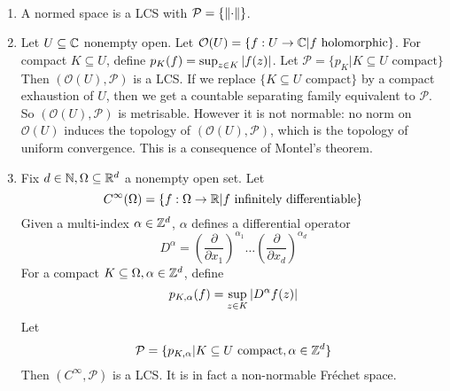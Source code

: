 \documentclass{article}
\begin{document}
\begin{egs}~

  \begin{enumerate}
    \item A normed space is a LCS with $\mathcal P = \{\left\lVert \cdot\right\rVert\}$.
    \item Let $U \subseteq \mathbb C$ nonempty open. Let $\mathcal O(U) = \{f : U \rightarrow \mathbb C | f \text{ holomorphic}\}$. For compact $K \subseteq U$, define $p_K(f) = \sup_{z \in K} \left\lvert f(z)\right\rvert$. Let
    $\mathcal P = \{p_K | K \subseteq U \text{ compact}\}$
    Then $(\mathcal O(U), \mathcal P)$ is a LCS. If we replace $\{K \subseteq U \text{ compact}\}$ by a compact exhaustion of $U$, then we get a countable separating family equivalent to $\mathcal P$. So $(\mathcal O(U), \mathcal P)$ is metrisable. However it is not normable: no norm on $\mathcal O(U)$ induces the topology of $(\mathcal O(U), \mathcal P)$, which is the topology of uniform convergence. This is a consequence of Montel's theorem.
    \item Fix $d \in \mathbb N, \Omega \subseteq \mathbb R^d$ a nonempty open set. Let
    $$C^\infty(\Omega) = \{f : \Omega \rightarrow \mathbb R | f \text{ infinitely differentiable}\}$$
    Given a multi-index $\alpha \in \mathbb Z^d$, $\alpha$ defines a differential operator
    $$D^\alpha = \left(\frac\partial{\partial x_1}\right)^{\alpha_1} \dots
    \left(\frac\partial{\partial x_d}\right)^{\alpha_d}$$
    For a compact $K \subseteq \Omega, \alpha \in \mathbb Z^d$, define
    $$p_{K, \alpha}(f) = \sup_{z \in K}\left\lvert D^\alpha f(z)\right\rvert$$
    Let
    $$\mathcal P = \{p_{K, \alpha} | K \subseteq U \text{ compact}, \alpha \in \mathbb Z^d\}$$
    Then $(C^\infty, \mathcal P)$ is a LCS. It is in fact a non-normable Fréchet space.
  \end{enumerate}
\end{egs}
\end{document}

